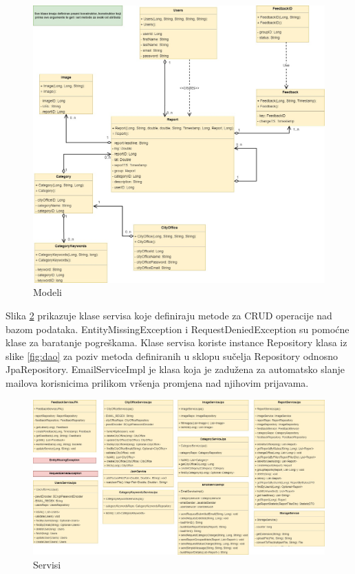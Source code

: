 			\begin{figure}[H]
				\includegraphics[width=\textwidth]{slike/dijagramRazreda/EntitiesOnly.jpg} %
				\caption{Modeli}
				\label{fig:repo} %
			\end{figure}
			
			\eject
			
			Slika \ref{fig:service} prikazuje klase servisa koje definiraju metode za CRUD operacije nad bazom podataka. EntityMissingException i RequestDeniedException su pomoćne klase za baratanje pogreškama. Klase servisa koriste instance Repository klasa iz slike \ref{fig:dao} za poziv metoda definiranih u sklopu sučelja Repository odnosno JpaRepository. EmailServiceImpl je klasa koja je zadužena za automatsko slanje mailova korisnicima prilikom vršenja promjena nad njihovim prijavama.
			
			\begin{figure}[H]
				\includegraphics[width=\textwidth]{slike/dijagramRazreda/serviceImpl.jpg} %
				\caption{Servisi}
				\label{fig:service} %
			\end{figure}
			
